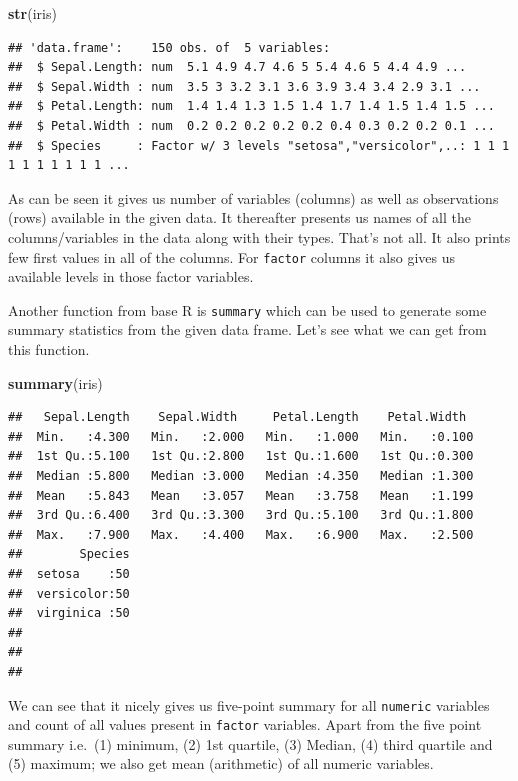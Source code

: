 \documentclass[
]{book}
\newenvironment{Shaded}{\begin{snugshade}}{\end{snugshade}}
\newcommand{\FunctionTok}[1]{\textcolor[rgb]{0.13,0.29,0.53}{\textbf{#1}}}
\newcommand{\NormalTok}[1]{#1}
\begin{document}
\begin{Shaded}
\begin{Highlighting}[]
\FunctionTok{str}\NormalTok{(iris)}
\end{Highlighting}
\end{Shaded}

\begin{verbatim}
## 'data.frame':    150 obs. of  5 variables:
##  $ Sepal.Length: num  5.1 4.9 4.7 4.6 5 5.4 4.6 5 4.4 4.9 ...
##  $ Sepal.Width : num  3.5 3 3.2 3.1 3.6 3.9 3.4 3.4 2.9 3.1 ...
##  $ Petal.Length: num  1.4 1.4 1.3 1.5 1.4 1.7 1.4 1.5 1.4 1.5 ...
##  $ Petal.Width : num  0.2 0.2 0.2 0.2 0.2 0.4 0.3 0.2 0.2 0.1 ...
##  $ Species     : Factor w/ 3 levels "setosa","versicolor",..: 1 1 1 1 1 1 1 1 1 1 ...
\end{verbatim}

As can be seen it gives us number of variables (columns) as well as observations (rows) available in the given data. It thereafter presents us names of all the columns/variables in the data along with their types. That's not all. It also prints few first values in all of the columns. For \texttt{factor} columns it also gives us available levels in those factor variables.

Another function from base R is \texttt{summary} which can be used to generate some summary statistics from the given data frame. Let's see what we can get from this function.

\begin{Shaded}
\begin{Highlighting}[]
\FunctionTok{summary}\NormalTok{(iris)}
\end{Highlighting}
\end{Shaded}

\begin{verbatim}
##   Sepal.Length    Sepal.Width     Petal.Length    Petal.Width   
##  Min.   :4.300   Min.   :2.000   Min.   :1.000   Min.   :0.100  
##  1st Qu.:5.100   1st Qu.:2.800   1st Qu.:1.600   1st Qu.:0.300  
##  Median :5.800   Median :3.000   Median :4.350   Median :1.300  
##  Mean   :5.843   Mean   :3.057   Mean   :3.758   Mean   :1.199  
##  3rd Qu.:6.400   3rd Qu.:3.300   3rd Qu.:5.100   3rd Qu.:1.800  
##  Max.   :7.900   Max.   :4.400   Max.   :6.900   Max.   :2.500  
##        Species  
##  setosa    :50  
##  versicolor:50  
##  virginica :50  
##                 
##                 
## 
\end{verbatim}

We can see that it nicely gives us five-point summary for all \texttt{numeric} variables and count of all values present in \texttt{factor} variables. Apart from the five point summary i.e.~(1) minimum, (2) 1st quartile, (3) Median, (4) third quartile and (5) maximum; we also get mean (arithmetic) of all numeric variables.
\end{document}

